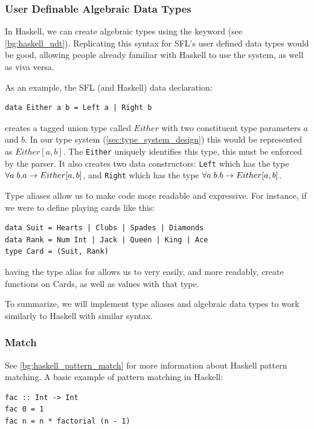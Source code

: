 \subsubsection{User Definable Algebraic Data Types}
In Haskell, we can create algebraic types using the  keyword (see \ref{bg:haskell_udt}). Replicating this syntax for \ac{SFL}'s user defined data types would be good, allowing people already familiar with Haskell to use the system, as well as viva versa. 

As an example, the SFL (and Haskell) data declaration:
\begin{lstlisting}[language=SFL_unboxed_noprelude]
data Either a b = Left a | Right b
\end{lstlisting}
\noindent creates a tagged union type called $Either$ with two constituent type parameters $a$ and $b$. In our type system (\ref{sec:type_system_design}) this would be represented as $Either[a, b]$. The \Unionname \verb|Either| uniquely identifies this type, this must be enforced by the parser. It also creates two data constructors: \verb|Left| which has the type $\forall a\;b. a \rightarrow Either[a,b]$, and \verb|Right| which has the type $\forall a\;b. b \rightarrow Either[a,b]$. 

Type aliases allow us to make code more readable and expressive. For instance, if we were to define playing cards like this:
\begin{lstlisting}[language=SFL_unboxed]
data Suit = Hearts | Clubs | Spades | Diamonds
data Rank = Num Int | Jack | Queen | King | Ace
type Card = (Suit, Rank)
\end{lstlisting}

\noindent having the type alias  for  allows us to very easily, and more readably, create functions on Cards, as well as values with that type. 

To summarize, we will implement type aliases and algebraic data types to work similarly to Haskell with similar syntax. 

\subsubsection{Match}
\label{c2_design_match}
See \ref{bg:haskell_pattern_match} for more information about Haskell pattern matching. A basic example of pattern matching in Haskell:

\begin{lstlisting}[language=SFL]
fac :: Int -> Int
fac 0 = 1
fac n = n * factorial (n - 1)
\end{lstlisting}

